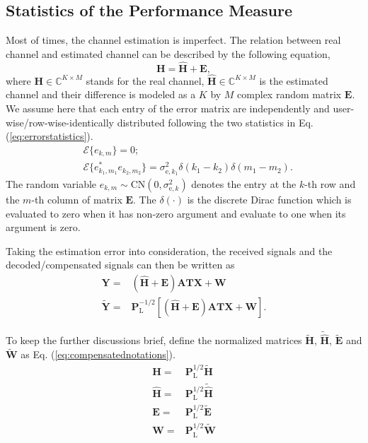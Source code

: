 \documentclass[12pt,draftclsnofoot,onecolumn,journal]{IEEEtran}
\begin{document}
\subsection{Statistics of the Performance Measure}
Most of times, the channel estimation is imperfect. The relation between real channel and estimated channel can be described by the following equation,
\begin{equation}
\mathbf H=\hat{\mathbf H}+\mathbf E,
\end{equation}
where $\mathbf H \in \mathbb C^{K\times M}$ stands for the real channel, $\hat{\mathbf H}\in\mathbb C^{K\times M}$ is the estimated channel and their difference is modeled as a $K$ by $M$ complex random matrix $\mathbf E$. We assume here that each entry of the error matrix are independently and user-wise/row-wise-identically distributed following the two statistics in Eq. (\ref{eq:errorstatistics}).
\begin{equation}
\begin{split}
&\mathcal E\{e_{k,m}\}=0;\\
&\mathcal E\{e_{k_1,m_1}^*e_{k_2,m_2}\}=\sigma_{\mathrm{e}, k_1}^2\delta(k_1-k_2)\delta(m_1-m_2).
\label{eq:errorstatistics}
\end{split}
\end{equation}
The random variable $e_{k,m}\sim \mathrm{CN}(0, \sigma_{\mathrm{e}, k}^2)$ denotes the entry at the $k$-th row and the $m$-th column of matrix $\mathbf E$. 
The $\delta(\cdot)$ is the discrete Dirac function which is evaluated to zero when it has non-zero argument and evaluate to one when its argument is zero.

Taking the estimation error into consideration, the received signals and the decoded/compensated signals can then be written as 
\begin{equation}
\begin{split}
\mathbf Y=&(\hat{\mathbf H}+\mathbf E)\mathbf{ATX}+\mathbf W\\
\tilde{\mathbf Y}=&\mathbf P_{\mathrm L}^{-1/2}[( \hat{\mathbf H}+\mathbf E)\mathbf{ATX}+\mathbf W].
 \label{eq:channelmodelwithestimationerror}
\end{split}
\end{equation}

To keep the further discussions brief, define the normalized matrices $\tilde{\mathbf H}$, $\tilde{\hat{\mathbf H}}$, $\tilde{\mathbf E}$ and $\tilde{\mathbf W}$ as  Eq. (\ref{eq:compensatednotations}).
\begin{equation}
\begin{split}
\mathbf H=		&\mathbf P_{\mathrm L}^{1/2}\tilde{\mathbf H}\\
\hat{\mathbf H}=	&\mathbf P_{\mathrm L}^{1/2}\tilde{\hat{\mathbf H}}\\
\mathbf E=		&\mathbf P_{\mathrm L}^{1/2}\tilde{\mathbf E}\\
\mathbf W=		&\mathbf P_{\mathrm L}^{1/2}\tilde{\mathbf W}
\end{split}
\label{eq:compensatednotations}
\end{equation}
\end{document}
